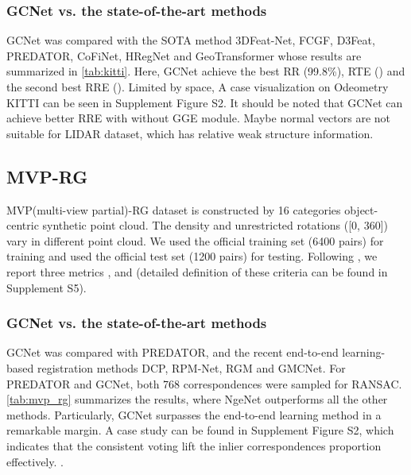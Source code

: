 \documentclass[10pt,twocolumn,letterpaper]{article}
\begin{document}
\subsubsection{GCNet vs. the state-of-the-art methods}\vspace{-.25em}
GCNet was compared with the SOTA method 3DFeat-Net\cite{yew20183dfeat}, FCGF\cite{choy2019fully}, D3Feat\cite{bai2020d3feat}, PREDATOR\cite{huang2021predator}, CoFiNet\cite{yu2021cofinet}, HRegNet\cite{lu2021hregnet} and GeoTransformer\cite{qin2022geometric} whose results are summarized in \cref{tab:kitti}. Here, GCNet achieve the best RR (99.8\%), RTE () and the second best RRE (). Limited by space, A case visualization on Odeometry KITTI can be seen in Supplement Figure S2. It should be noted that GCNet can achieve better RRE with  without GGE module. Maybe normal vectors are not suitable for LIDAR dataset, which has relative weak structure information. 

\subsection{MVP-RG}

MVP(multi-view partial)-RG dataset\cite{pan2021variational,pan2021robust} is constructed by 16 categories object-centric synthetic point cloud. 
The density and unrestricted rotations ([0, 360]) vary in different point cloud. We used the official training set (6400 pairs) for training and used the official test set (1200 pairs) for testing.
Following \cite{pan2021robust}, we report three metrics , and  (detailed definition of these criteria can be found in Supplement S5).

\vspace{-.75em}
\subsubsection{GCNet vs. the state-of-the-art methods}\vspace{-.25em}
GCNet was compared with PREDATOR\cite{huang2021predator}, and the recent end-to-end learning-based registration methods DCP\cite{wang2019deep}, RPM-Net\cite{yew2020rpm}, RGM\cite{fu2021robust} and GMCNet\cite{pan2021robust}. For PREDATOR and GCNet, both 768 correspondences were sampled for RANSAC. \cref{tab:mvp_rg} summarizes the results, where NgeNet outperforms all the other methods. Particularly, GCNet surpasses the end-to-end learning method in a remarkable margin. A case study can be found in Supplement Figure S2, which indicates that the consistent voting lift the inlier correspondences proportion effectively.
. 
\end{document}
